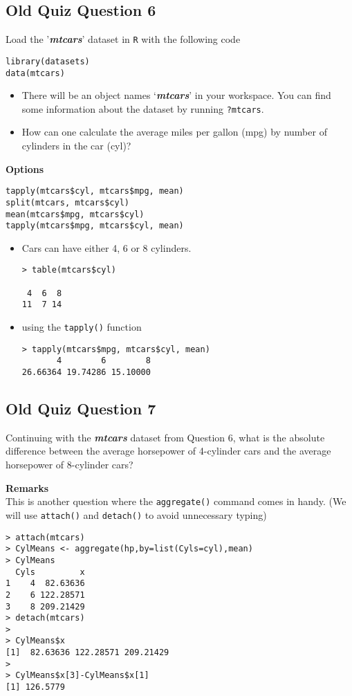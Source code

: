 \documentclass[12pt]{article}
\begin{document}
\newpage
\subsection*{Old Quiz Question 6}
Load the '\textit{\textbf{mtcars}}' dataset in \texttt{R} with the following code

\begin{framed}
\begin{verbatim}
library(datasets)
data(mtcars)
\end{verbatim}
\end{framed}

\begin{itemize}
\item There will be an object names `\textit{\textbf{mtcars}}' in your workspace. You can find some information about the dataset by running
\texttt{?mtcars}.

\item How can one calculate the average miles per gallon (mpg) by number of cylinders in the car (cyl)?
\end{itemize}
\textbf{Options}
\begin{verbatim}
tapply(mtcars$cyl, mtcars$mpg, mean)
split(mtcars, mtcars$cyl)
mean(mtcars$mpg, mtcars$cyl)
tapply(mtcars$mpg, mtcars$cyl, mean)
\end{verbatim}

\begin{itemize}
\item Cars can have either 4, 6 or 8 cylinders.
\begin{verbatim}
> table(mtcars$cyl)

 4  6  8 
11  7 14 
\end{verbatim}
\item using the \texttt{tapply()} function
\begin{verbatim}
> tapply(mtcars$mpg, mtcars$cyl, mean)
       4        6        8 
26.66364 19.74286 15.10000
\end{verbatim}
\end{itemize}
\newpage
\subsection*{Old Quiz Question 7}
Continuing with the \textit{\textbf{mtcars}} dataset from Question 6, what is the absolute difference between the average horsepower of 4-cylinder cars and the average horsepower of 8-cylinder cars?

\bigskip
\noindent \textbf{Remarks}\\
This is another question where the \texttt{aggregate()} command comes in handy. (We will use \texttt{attach()} and \texttt{detach()} to avoid unnecessary typing)
\begin{verbatim}
> attach(mtcars)
> CylMeans <- aggregate(hp,by=list(Cyls=cyl),mean)
> CylMeans 
  Cyls         x
1    4  82.63636
2    6 122.28571
3    8 209.21429
> detach(mtcars)
>
> CylMeans$x
[1]  82.63636 122.28571 209.21429
>
> CylMeans$x[3]-CylMeans$x[1]
[1] 126.5779
\end{verbatim}
\end{document}

